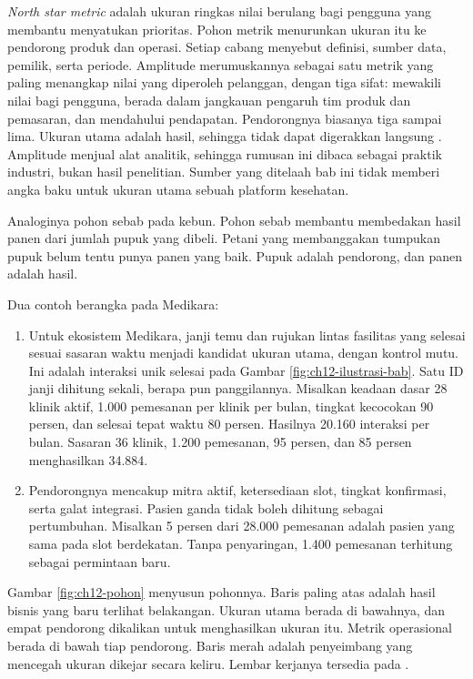 \textit{North star metric} adalah ukuran ringkas nilai berulang bagi pengguna yang membantu menyatukan prioritas. Pohon metrik menurunkan ukuran itu ke
pendorong produk dan operasi. Setiap cabang menyebut definisi, sumber data, pemilik, serta periode. Amplitude merumuskannya sebagai satu metrik yang paling
menangkap nilai yang diperoleh pelanggan, dengan tiga sifat: mewakili nilai bagi pengguna, berada dalam jangkauan pengaruh tim produk dan pemasaran, dan mendahului pendapatan.
Pendorongnya biasanya tiga sampai lima. Ukuran utama adalah hasil, sehingga tidak dapat digerakkan langsung \cite{c12-amplitude-nsm}. Amplitude menjual
alat analitik, sehingga rumusan ini dibaca sebagai praktik industri, bukan hasil penelitian. Sumber yang ditelaah bab ini tidak memberi angka baku untuk
ukuran utama sebuah platform kesehatan.

Analoginya pohon sebab pada kebun. Pohon sebab membantu membedakan hasil panen dari jumlah pupuk yang dibeli. Petani yang membanggakan tumpukan pupuk belum
tentu punya panen yang baik. Pupuk adalah pendorong, dan panen adalah hasil.

Dua contoh berangka pada Medikara:
\begin{enumerate}
  \item Untuk ekosistem Medikara, janji temu dan rujukan lintas fasilitas yang selesai sesuai sasaran waktu menjadi kandidat ukuran utama, dengan kontrol mutu.
        Ini adalah interaksi unik selesai pada Gambar \ref{fig:ch12-ilustrasi-bab}. Satu ID janji dihitung sekali, berapa pun panggilannya. Misalkan keadaan dasar
        28 klinik aktif, 1.000 pemesanan per klinik per bulan, tingkat kecocokan 90 persen, dan selesai tepat waktu 80 persen. Hasilnya 20.160 interaksi per bulan.
        Sasaran 36 klinik, 1.200 pemesanan, 95 persen, dan 85 persen menghasilkan 34.884.
  \item Pendorongnya mencakup mitra aktif, ketersediaan slot, tingkat konfirmasi, serta galat integrasi. Pasien ganda tidak boleh dihitung sebagai pertumbuhan.
        Misalkan 5 persen dari 28.000 pemesanan adalah pasien yang sama pada slot berdekatan. Tanpa penyaringan, 1.400 pemesanan terhitung sebagai permintaan baru.
\end{enumerate}

Gambar \ref{fig:ch12-pohon} menyusun pohonnya. Baris paling atas adalah hasil bisnis yang baru terlihat belakangan. Ukuran utama berada di bawahnya, dan
empat pendorong dikalikan untuk menghasilkan ukuran itu. Metrik operasional berada di bawah tiap pendorong. Baris merah adalah penyeimbang yang mencegah ukuran
dikejar secara keliru. Lembar kerjanya tersedia pada .


